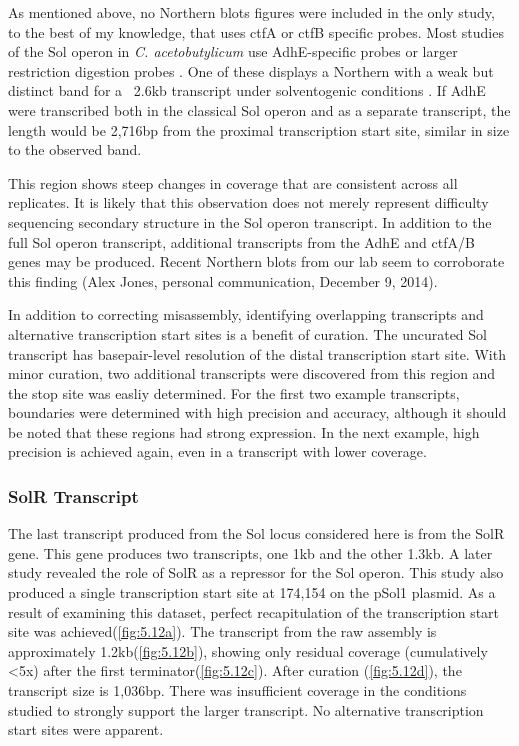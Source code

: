 As mentioned above, no Northern blots figures were included in the only study, to the best of my knowledge, that uses ctfA or ctfB specific probes\cite{65}. Most studies of the Sol operon in \textit{C. acetobutylicum} use AdhE-specific probes or larger restriction digestion probes \cite{63,68,71}. One of these displays a Northern with a weak but distinct band for a ~2.6kb transcript under solventogenic conditions \cite{69}. If AdhE were transcribed both in the classical Sol operon and as a separate transcript, the length would be 2,716bp from the proximal transcription start site, similar in size to the observed band\cite{69}. 

This region shows steep changes in coverage that are consistent across all replicates. It is likely that this observation does not merely represent difficulty sequencing secondary structure in the Sol operon transcript. In addition to the full Sol operon transcript, additional transcripts from the AdhE and ctfA/B genes may be produced. Recent Northern blots from our lab seem to corroborate this finding (Alex Jones, personal communication, December 9, 2014).

In addition to correcting misassembly, identifying overlapping transcripts and alternative transcription start sites is a benefit of curation. The uncurated Sol transcript has basepair-level resolution of the distal transcription start site. With minor curation, two additional transcripts were discovered from this region and the stop site was easliy determined. For the first two example transcripts, boundaries were determined with high precision and accuracy, although it should be noted that these regions had strong expression. In the next example, high precision is achieved again, even in a transcript with lower coverage.


\subsubsection{SolR Transcript}
The last transcript produced from the Sol locus considered here is from the SolR gene. This gene produces two transcripts, one 1kb and the other 1.3kb\cite{63}. A later study revealed the role of SolR as a repressor for the Sol operon\cite{69}. This study also produced a single transcription start site at 174,154 on the pSol1 plasmid. As a result of examining this dataset, perfect recapitulation of the transcription start site was achieved(\ref{fig:5.12a}). The transcript from the raw assembly is approximately 1.2kb(\ref{fig:5.12b}), showing only residual coverage (cumulatively \textless 5x) after the first terminator(\ref{fig:5.12c}). After curation (\ref{fig:5.12d}), the transcript size is 1,036bp. There was insufficient coverage in the conditions studied to strongly support the larger transcript. No alternative transcription start sites were apparent.

